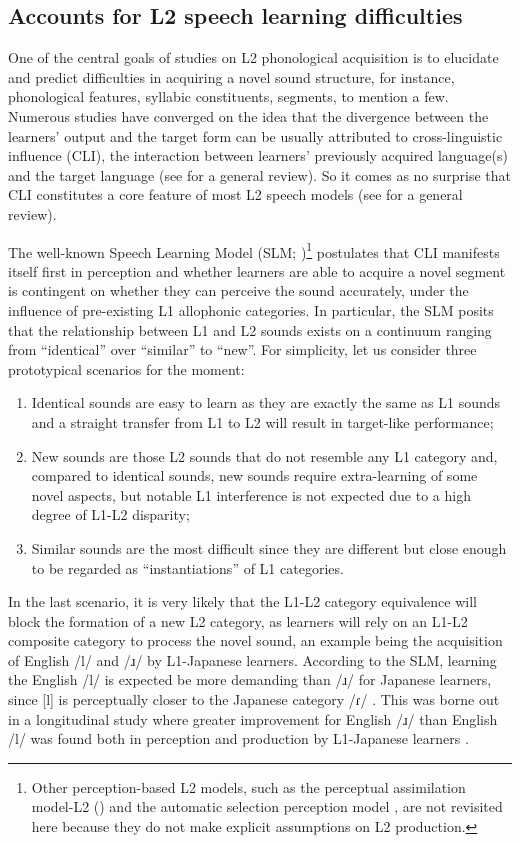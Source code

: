 \documentclass[output=paper]{../langscibook}
\begin{document}
\subsection{Accounts for L2 speech learning difficulties}
\label{sec:zhou:1.2}


One of the central goals of studies on L2 phonological acquisition is to elucidate and predict difficulties in acquiring a novel sound structure, for instance, phonological features, syllabic constituents, segments, to mention a few. Numerous studies have converged on the idea that the divergence between the learners’ output and the target form can be usually attributed to cross-linguistic influence (CLI), the interaction between learners’ previously acquired language(s) and the target language (see \citealt{Major2008} for a general review). So it comes as no surprise that CLI constitutes a core feature of most L2 speech models (see \citealt{ColantoniEtAl2015} for a general review).

The well-known Speech Learning Model (SLM; \citealt{Flege1995})\footnote{Other perception-based L2 models, such as the perceptual assimilation model-L2 (\citealt{BestTyler2007}) and the automatic selection perception model \citep{Strange2011}, are not revisited here because they do not make explicit assumptions on L2 production.}  postulates that CLI manifests itself first in perception and whether learners are able to acquire a novel segment is contingent on whether they can perceive the sound accurately, under the influence of pre-existing L1 allophonic categories. In particular, the SLM posits that the relationship between L1 and L2 sounds exists on a continuum ranging from “identical” over “similar” to “new”. For simplicity, let us consider three prototypical scenarios for the moment: 

\begin{enumerate}[label=(\roman*)]
\item Identical sounds are easy to learn as they are exactly the same as L1 sounds and a straight transfer from L1 to L2 will result in target-like performance; 
\item New sounds are those L2 sounds that do not resemble any L1 category and, compared to identical sounds, new sounds require extra-learning of some novel aspects, but notable L1 interference is not expected due to a high degree of L1-L2 disparity; 
\item Similar sounds are the most difficult since they are different but close enough to be regarded as “instantiations” of L1 categories. 
\end{enumerate}
In the last scenario, it is very likely that the L1-L2 category equivalence will block the formation of a new L2 category, as learners will rely on an L1-L2 composite category to process the novel sound, an example being the acquisition of English /l/ and /ɹ/ by L1-Japanese learners. According to the SLM, learning the English /l/ is expected be more demanding than /ɹ/ for Japanese learners, since [l] is perceptually closer to the Japanese category /ɾ/ \citep{IversonEtAl2001}. This was borne out in a longitudinal study where greater improvement for English /ɹ/ than English /l/ was found both in perception and production by L1-Japanese learners \citep{AoyamaEtAl2004}.
\end{document}
